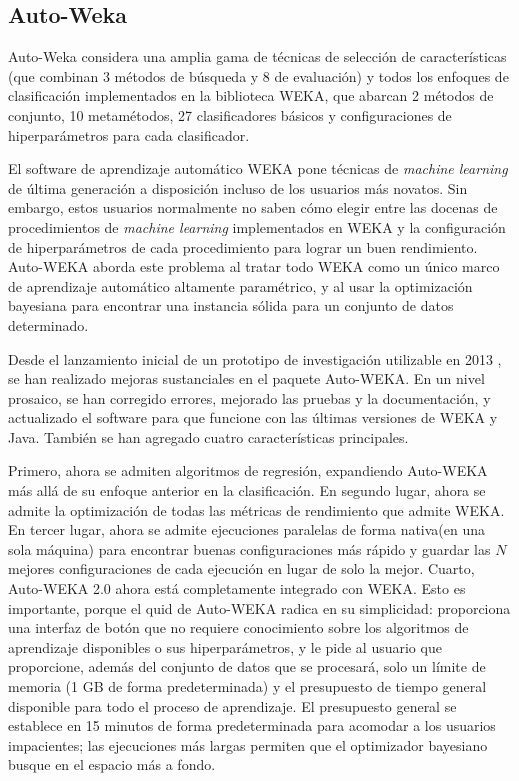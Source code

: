 \subsection{Auto-Weka} 
Auto-Weka \parencite{13} considera una amplia gama de técnicas de selección de características (que combinan 3 métodos de búsqueda y 8 de evaluación) y todos los enfoques de clasificación implementados en la biblioteca WEKA, que abarcan 2 métodos de conjunto, 10 metamétodos, 27 clasificadores básicos y configuraciones de hiperparámetros para cada clasificador.   

El software de aprendizaje automático WEKA pone técnicas de \textit{machine learning} de última generación a disposición incluso de los usuarios más novatos. Sin embargo, estos usuarios normalmente no saben cómo elegir entre las docenas de procedimientos de \textit{machine learning} implementados en WEKA y la configuración de hiperparámetros de cada procedimiento para lograr un buen rendimiento. Auto-WEKA aborda este problema al tratar todo WEKA como un único marco de aprendizaje automático altamente paramétrico, y al usar la optimización bayesiana para encontrar una instancia sólida para un conjunto de datos determinado.

Desde el lanzamiento inicial de un prototipo de investigación utilizable en 2013 \parencite{13}, se han realizado mejoras sustanciales en el paquete Auto-WEKA. En un nivel prosaico, se han corregido errores, mejorado las pruebas y la documentación, y actualizado el software para que funcione con las últimas versiones de WEKA y Java. También se han agregado cuatro características principales.

Primero, ahora se admiten algoritmos de regresión, expandiendo Auto-WEKA más allá de su enfoque anterior en la clasificación. En segundo lugar, ahora se admite la optimización de todas las métricas de rendimiento que admite WEKA. En tercer lugar, ahora se admite ejecuciones paralelas de forma nativa(en una sola máquina) para encontrar buenas configuraciones más rápido y guardar las $N$ mejores configuraciones de cada ejecución en lugar de solo la mejor. Cuarto, Auto-WEKA 2.0 ahora está completamente integrado con WEKA. Esto es importante, porque el quid de Auto-WEKA radica en su simplicidad: proporciona una interfaz de botón que no requiere conocimiento sobre los algoritmos de aprendizaje disponibles o sus hiperparámetros, y le pide al usuario que proporcione, además del conjunto de datos que se procesará, solo un límite de memoria (1 GB de forma predeterminada) y el presupuesto de tiempo general disponible para todo el proceso de aprendizaje. El presupuesto general se establece en 15 minutos de forma predeterminada para acomodar a los usuarios impacientes; las ejecuciones más largas permiten que el optimizador bayesiano busque en el espacio más a fondo.

